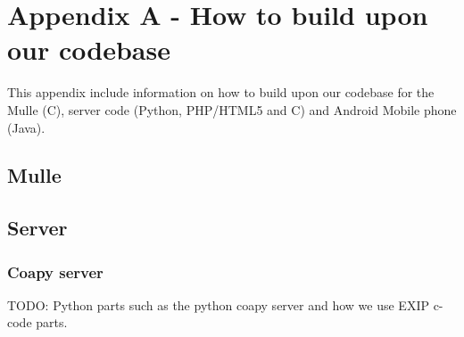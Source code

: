 


\section{Appendix A - How to build upon our codebase}
This appendix include information on how to build upon our codebase for the Mulle (C), server code (Python, PHP/HTML5 and C) and Android Mobile phone (Java).
\subsection{Mulle}
\subsection{Server}
\subsubsection{Coapy server}
TODO: Python parts such as the python coapy server and how we use EXIP c-code parts. 
